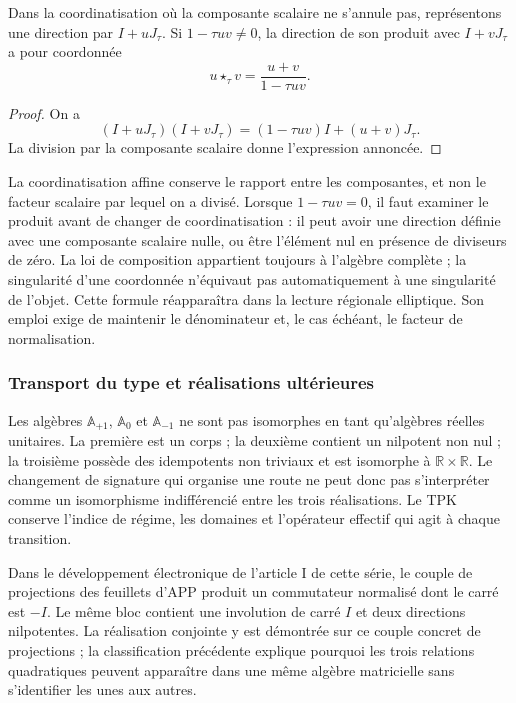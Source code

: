 \begin{proposition}
\label{trit-ampl-prop-pendientes}
Dans la coordinatisation où la composante scalaire ne s'annule pas, représentons une
direction par \(I+uJ_\tau\). Si \(1-\tau uv\ne0\), la direction de son
produit avec \(I+vJ_\tau\) a pour coordonnée
\[
 u\star_\tau v=\frac{u+v}{1-\tau uv}.
\]
\end{proposition}
\begin{proof}
On a
\[
 (I+uJ_\tau)(I+vJ_\tau)
   =(1-\tau uv)I+(u+v)J_\tau.
\]
La division par la composante scalaire donne l'expression annoncée.
\end{proof}

La coordinatisation affine conserve le rapport entre les composantes, et non le facteur scalaire
par lequel on a divisé. Lorsque \(1-\tau uv=0\), il faut examiner le produit avant de
changer de coordinatisation : il peut avoir une direction définie avec une composante scalaire
nulle, ou être l'élément nul en présence de diviseurs de zéro. La loi de
composition appartient toujours à l'algèbre complète ; la singularité d'une
coordonnée n'équivaut pas automatiquement à une singularité de l'objet.
Cette formule réapparaîtra dans la lecture régionale elliptique. Son emploi exige
de maintenir le dénominateur et, le cas échéant, le facteur de normalisation.

\subsubsection{Transport du type et réalisations ultérieures}
\label{trit-ampl-puentes}

Les algèbres \(\mathbb A_{+1}\), \(\mathbb A_0\) et
\(\mathbb A_{-1}\) ne sont pas isomorphes en tant qu'algèbres réelles unitaires.
La première est un corps ; la deuxième contient un nilpotent non nul ; la
troisième possède des idempotents non triviaux et est isomorphe à
\(\mathbb R\times\mathbb R\). Le changement de signature qui organise une
route ne peut donc pas s'interpréter comme un isomorphisme indifférencié entre les
trois réalisations. Le TPK conserve l'indice de régime, les domaines et
l'opérateur effectif qui agit à chaque transition.

Dans le développement électronique de l’article I de cette série, le couple de
projections des feuillets d’APP
produit un commutateur normalisé dont le carré est \(-I\). Le même bloc
contient une involution de carré \(I\) et deux directions nilpotentes. La
réalisation conjointe y est démontrée sur ce couple concret de projections ;
la classification précédente explique pourquoi les trois relations quadratiques
peuvent apparaître dans une même algèbre matricielle sans s’identifier les unes aux autres.

